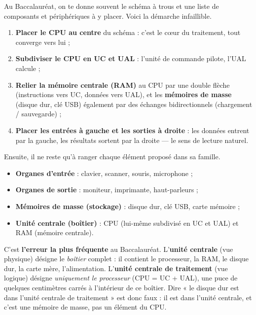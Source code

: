 \documentclass[11pt]{article}
\newcounter{popsec}
\newcounter{popsub}
\newcommand{\courssub}[1]{%
  \stepcounter{popsub}%
  \par\vspace{9pt}\noindent{\popxbold\fontsize{11.5}{13}\selectfont\color{popink}{\color{poporange}\thepopsec.\thepopsub}\hspace{6pt}#1}\par\nopagebreak\vspace{4pt}
}
\begin{document}
\courssub{Compléter le schéma fonctionnel}

Au Baccalauréat, on te donne souvent le schéma à trous et une liste de composants et périphériques à y placer. Voici la démarche infaillible.

\begin{methode}
\begin{enumerate}
\item \textbf{Placer le CPU au centre} du schéma : c'est le cœur du traitement, tout converge vers lui ;
\item \textbf{Subdiviser le CPU en UC et UAL} : l'unité de commande pilote, l'UAL calcule ;
\item \textbf{Relier la mémoire centrale (RAM)} au CPU par une double flèche (instructions vers UC, données vers UAL), et les \textbf{mémoires de masse} (disque dur, clé USB) également par des échanges bidirectionnels (chargement / sauvegarde) ;
\item \textbf{Placer les entrées à gauche et les sorties à droite} : les données entrent par la gauche, les résultats sortent par la droite — le sens de lecture naturel.
\end{enumerate}
Ensuite, il ne reste qu'à ranger chaque élément proposé dans sa famille.
\end{methode}

\begin{exemplebox}
\begin{itemize}
\item \textbf{Organes d'entrée} : clavier, scanner, souris, microphone ;
\item \textbf{Organes de sortie} : moniteur, imprimante, haut-parleurs ;
\item \textbf{Mémoires de masse (stockage)} : disque dur, clé USB, carte mémoire ;
\item \textbf{Unité centrale (boîtier)} : CPU (lui-même subdivisé en UC et UAL) et RAM (mémoire centrale).
\end{itemize}
\end{exemplebox}

\begin{attention}
C'est \textbf{l'erreur la plus fréquente} au Baccalauréat. L'\textbf{unité centrale} (vue physique) désigne le \emph{boîtier} complet : il contient le processeur, la RAM, le disque dur, la carte mère, l'alimentation. L'\textbf{unité centrale de traitement} (vue logique) désigne \emph{uniquement le processeur} (CPU = UC + UAL), une puce de quelques centimètres carrés à l'intérieur de ce boîtier. Dire « le disque dur est dans l'unité centrale de traitement » est donc faux : il est dans l'unité centrale, et c'est une mémoire de masse, pas un élément du CPU.
\end{attention}
\end{document}
